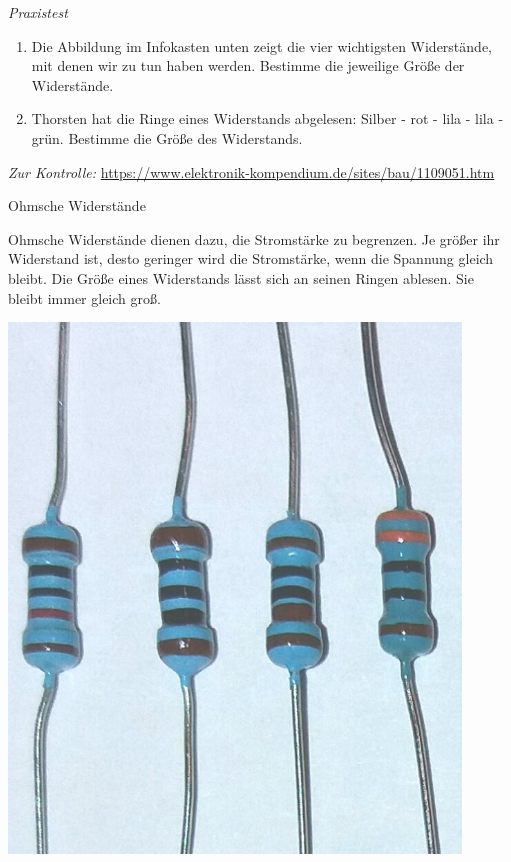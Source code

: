 \begin{aufgabe} \emph{Praxistest}
	\begin{enumerate}[label=\alph*), itemsep=0ex, parsep=0ex]
		\item Die Abbildung im Infokasten unten zeigt die vier wichtigsten Widerstände, mit denen wir zu tun haben werden. Bestimme die jeweilige Größe der Widerstände.
		\item Thorsten hat die Ringe eines Widerstands abgelesen: Silber - rot - lila - lila - grün. Bestimme die Größe des Widerstands.
	\end{enumerate}
	\medskip
	\emph{Zur Kontrolle:} \url{https://www.elektronik-kompendium.de/sites/bau/1109051.htm}
\end{aufgabe}

\begin{zsfg}{Ohmsche Widerstände}
	\begin{minipage}{0.65\textwidth}
		Ohmsche Widerstände dienen dazu, die Stromstärke zu begrenzen. Je größer ihr Widerstand ist, desto geringer wird die Stromstärke, wenn die Spannung gleich bleibt. Die Größe eines Widerstands lässt sich an seinen Ringen ablesen. Sie bleibt immer gleich groß.
	\end{minipage}
	\hfill
	\begin{minipage}{0.33\textwidth}
		\begin{minipage}{0.55\textwidth}
			\centering
			\includegraphics[width=0.9\textwidth,angle=90]{./pics/Widerstaende.jpg}

\end{minipage}
\end{minipage}
\end{zsfg}

